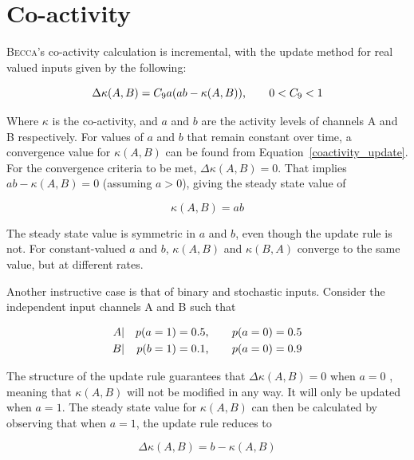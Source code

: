 \section{Co-activity}
\label{coactivity_calc}
\textsc{Becca}'s co-activity calculation is incremental, with the update method for real valued inputs given by the following:

\begin{equation}
\Delta\kappa(A, B) = C_9 a ( a b - \kappa(A, B) ) \mbox{,  \hspace{0.2in}  } 0 < C_9 < 1		
\label{coactivity_update}
\end{equation}

Where $\kappa$ is the co-activity, and $a$ and $b$ are the activity levels of channels A and B respectively. For values of $a$ and $b$ that remain constant over time, a convergence value for $\kappa(A, B)$ can be found from Equation~\ref{coactivity_update}. For the convergence criteria to be met, $\Delta\kappa(A, B) = 0$. That implies $a b - \kappa(A, B) = 0$ (assuming $a > 0$), giving the steady state value of

\begin{equation}
\kappa(A, B) = a b 
\end{equation}

The steady state value is symmetric in $a$ and $b$, even though the update rule is not. For constant-valued $a$ and $b$, $\kappa(A, B)$ and $\kappa(B, A)$ converge to the same value, but at different rates. 

Another instructive case is that of binary and stochastic inputs. Consider the independent input channels A and B such that

\begin{eqnarray}
A &|& p(a = 1) = 0.5 \mbox{, \hspace{0.2in}  } p(a = 0) = 0.5\\
B &|& p(b = 1) = 0.1 \mbox{, \hspace{0.2in}  } p(a = 0) = 0.9 	
\end{eqnarray}

The structure of the update rule guarantees that $\Delta\kappa(A, B) = 0$ when $a = 0$ , meaning that $\kappa(A, B)$ will not be modified in any way. It will only be updated when $a = 1$. The steady state value for $\kappa(A, B)$ can then be calculated by observing that when $a = 1$, the update rule reduces to 

\begin{equation}
\Delta \kappa(A, B) = b - \kappa(A, B)  
\end{equation}

